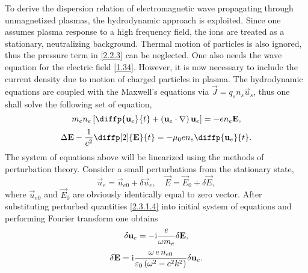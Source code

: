 To derive the dispersion relation of electromagnetic wave propagating through unmagnetized plasmas, the hydrodynamic approach is exploited. Since one assumes plasma response to a high frequency field, the ions are treated as a stationary, neutralizing background. Thermal motion of particles is also ignored, thus the pressure term in \ref{2.2.3} can be neglected. One also needs the wave equation for the electric field \ref{1.34}. However, it is now necessary to include the current density due to motion of charged particles in plasma. The hydrodynamic equations are coupled with the Maxwell's equations via $ \vec{J} = q_s n_s \vec{u}_s $, thus one shall solve the following set of equation,
\begin{equation}
\label{2.3.1.2}
m_e n_e \left[ \diffp{\vec{u}_e}{t} + \left(\vec{u}_e \cdot \nabla \right) \vec{u}_e \right] = - e n_e \vec{E},
\end{equation}
\begin{equation}
\label{2.3.1.3}
\laplace{\vec{E}} - \frac{1}{c^{2}} \diffp[2]{\vec{E}}{t} = - \mu_0 e n_e \diffp{\vec{u}_e}{t}.
\end{equation}
The system of equations above will be linearized using the methods of perturbation theory. Consider a small perturbations from the stationary state,
\begin{equation}
\label{2.3.1.4}
\vec{u}_{e} = \vec{u}_{e0} + \delta \vec{u}_{e}, \quad \vec{E} = \vec{E}_{0} + \delta \vec{E},
\end{equation}
where $ \vec{u}_{e0} $ and $ \vec{E}_{0} $ are obviously identically equal to zero vector. After substituting perturbed quantities \ref{2.3.1.4} into initial system of equations and performing Fourier transform one obtains
\begin{equation}
\label{2.3.1.6}
\delta \mathbf{u}_e = -\mathrm{i} \frac{e}{\omega m_e} \delta \mathbf{E},
\end{equation}
\begin{equation}
\label{2.3.1.7}
\delta \mathbf{E} = \mathrm{i} \frac{\omega \, e \, n_{e0}}{\varepsilon_0 \left(\omega^2 - c^2 k^2 \right)} \delta \mathbf{u}_e.
\end{equation}

